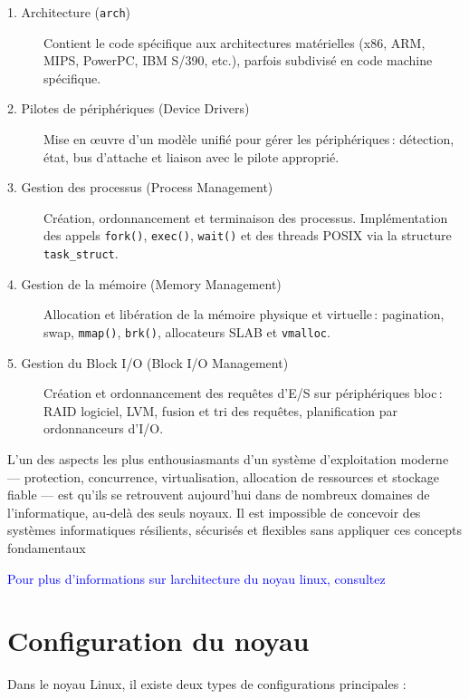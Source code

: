 \begin{description}
  \item[1. Architecture (\texttt{arch})]  
    Contient le code spécifique aux architectures matérielles (x86, ARM, MIPS, PowerPC, IBM S/390, etc.), parfois subdivisé en code machine spécifique.
  \item[2. Pilotes de périphériques (Device Drivers)]  
    Mise en œuvre d’un modèle unifié pour gérer les périphériques : détection, état, bus d’attache et liaison avec le pilote approprié.
  \item[3. Gestion des processus (Process Management)]  
    Création, ordonnancement et terminaison des processus. Implémentation des appels \texttt{fork()}, \texttt{exec()}, \texttt{wait()} et des threads POSIX via la structure \texttt{task\_struct}.
  \item[4. Gestion de la mémoire (Memory Management)]  
    Allocation et libération de la mémoire physique et virtuelle : pagination, swap, \texttt{mmap()}, \texttt{brk()}, allocateurs SLAB et \texttt{vmalloc}.
  \item[5. Gestion du Block I/O (Block I/O Management)]  
    Création et ordonnancement des requêtes d’E/S sur périphériques bloc : RAID logiciel, LVM, fusion et tri des requêtes, planification par ordonnanceurs d’I/O.
\end{description}


\bigskip
L’un des aspects les plus enthousiasmants d’un système d’exploitation moderne — protection, concurrence, virtualisation, allocation de ressources et stockage fiable — est qu’ils se retrouvent aujourd’hui dans de nombreux domaines de l’informatique, au‑delà des seuls noyaux. Il est impossible de concevoir des systèmes informatiques résilients, sécurisés et flexibles sans appliquer ces concepts fondamentaux


\textcolor{blue}{Pour plus d’informations sur larchitecture du noyau linux, consultez \cite{Linux_kernel_course} }  
\section{Configuration du noyau}
Dans le noyau Linux, il existe deux types de configurations principales :

